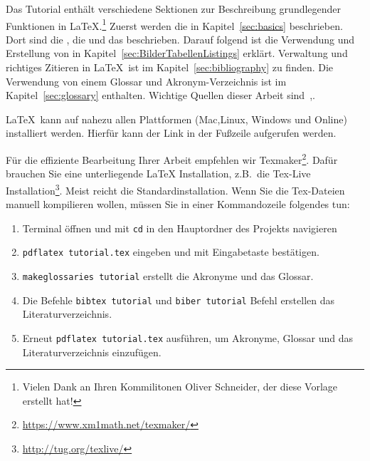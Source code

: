 Das Tutorial enthält verschiedene Sektionen zur Beschreibung grundlegender Funktionen in \LaTeX.\footnote{Vielen Dank an Ihren Kommilitonen Oliver Schneider, der diese Vorlage erstellt hat!}
Zuerst werden die  in Kapitel~\ref{sec:basics} beschrieben.
Dort sind die , die 
und das  beschrieben.
Darauf folgend ist die Verwendung und Erstellung von  in Kapitel~\ref{sec:BilderTabellenListings} erklärt.
Verwaltung und richtiges Zitieren in \LaTeX~ist im Kapitel~\ref{sec:bibliography} zu finden.
Die Verwendung von einem Glossar und Akronym-Verzeichnis ist im Kapitel~\ref{sec:glossary} enthalten.
Wichtige Quellen dieser Arbeit sind~\cite{Dermeval2015},\cite{pohl2016requirements}.

\LaTeX~kann auf nahezu allen Plattformen (Mac,Linux, Windows und Online) installiert werden.
Hierfür kann der Link in der Fußzeile aufgerufen werden.

Für die effiziente Bearbeitung Ihrer Arbeit empfehlen wir Texmaker\footnote{\url{https://www.xm1math.net/texmaker/}}.
Dafür brauchen Sie eine unterliegende LaTeX Installation, z.B.~die Tex-Live Installation\footnote{\url{http://tug.org/texlive/}}.
Meist reicht die Standardinstallation.
Wenn Sie die Tex-Dateien manuell kompilieren wollen, müssen Sie in einer Kommandozeile folgendes tun:
\begin{enumerate}
    \item Terminal öffnen und mit \lstinline|cd| in den Hauptordner des Projekts navigieren
    \item \lstinline|pdflatex tutorial.tex| eingeben und mit Eingabetaste bestätigen.
    \item \lstinline|makeglossaries tutorial| erstellt die Akronyme und das Glossar.
    \item Die Befehle \lstinline|bibtex tutorial| und  \lstinline|biber tutorial| Befehl erstellen das Literaturverzeichnis.
    \item Erneut \lstinline|pdflatex tutorial.tex| ausführen, um Akronyme, Glossar und das Literaturverzeichnis einzufügen.
\end{enumerate}


